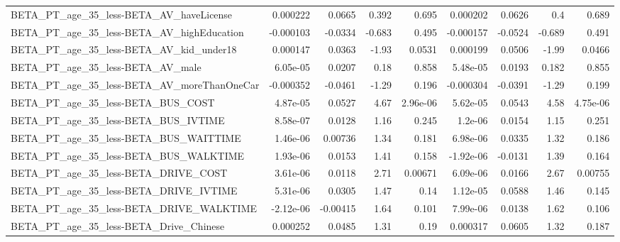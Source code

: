 \begin{tabular}{lrrrrrrrr}
BETA\_PT\_age\_35\_less-BETA\_AV\_haveLicense            &    0.000222 &       0.0665 &    0.392 &    0.695 &   0.000202 &      0.0626 &          0.4 &         0.689 \\
BETA\_PT\_age\_35\_less-BETA\_AV\_highEducation          &   -0.000103 &      -0.0334 &   -0.683 &    0.495 &  -0.000157 &     -0.0524 &       -0.689 &         0.491 \\
BETA\_PT\_age\_35\_less-BETA\_AV\_kid\_under18            &    0.000147 &       0.0363 &    -1.93 &   0.0531 &   0.000199 &      0.0506 &        -1.99 &        0.0466 \\
BETA\_PT\_age\_35\_less-BETA\_AV\_male                   &    6.05e-05 &       0.0207 &     0.18 &    0.858 &   5.48e-05 &      0.0193 &        0.182 &         0.855 \\
BETA\_PT\_age\_35\_less-BETA\_AV\_moreThanOneCar         &   -0.000352 &      -0.0461 &    -1.29 &    0.196 &  -0.000304 &     -0.0391 &        -1.29 &         0.199 \\
BETA\_PT\_age\_35\_less-BETA\_BUS\_COST                  &    4.87e-05 &       0.0527 &     4.67 & 2.96e-06 &   5.62e-05 &      0.0543 &         4.58 &      4.75e-06 \\
BETA\_PT\_age\_35\_less-BETA\_BUS\_IVTIME                &    8.58e-07 &       0.0128 &     1.16 &    0.245 &    1.2e-06 &      0.0154 &         1.15 &         0.251 \\
BETA\_PT\_age\_35\_less-BETA\_BUS\_WAITTIME              &    1.46e-06 &      0.00736 &     1.34 &    0.181 &   6.98e-06 &      0.0335 &         1.32 &         0.186 \\
BETA\_PT\_age\_35\_less-BETA\_BUS\_WALKTIME              &    1.93e-06 &       0.0153 &     1.41 &    0.158 &  -1.92e-06 &     -0.0131 &         1.39 &         0.164 \\
BETA\_PT\_age\_35\_less-BETA\_DRIVE\_COST                &    3.61e-06 &       0.0118 &     2.71 &  0.00671 &   6.09e-06 &      0.0166 &         2.67 &       0.00755 \\
BETA\_PT\_age\_35\_less-BETA\_DRIVE\_IVTIME              &    5.31e-06 &       0.0305 &     1.47 &     0.14 &   1.12e-05 &      0.0588 &         1.46 &         0.145 \\
BETA\_PT\_age\_35\_less-BETA\_DRIVE\_WALKTIME            &   -2.12e-06 &     -0.00415 &     1.64 &    0.101 &   7.99e-06 &      0.0138 &         1.62 &         0.106 \\
BETA\_PT\_age\_35\_less-BETA\_Drive\_Chinese             &    0.000252 &       0.0485 &     1.31 &     0.19 &   0.000317 &      0.0605 &         1.32 &         0.187 \\

\end{tabular}
